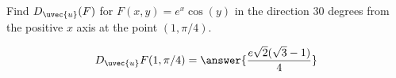 \documentclass{ximera}
\author{David Guichard \and Neal Koblitz \and H. Jerome Keisler \and Albert Scheller \and Barry Balof \and Mike Wills \and Matthew Carr \and Bart Snapp}
\begin{document}
\begin{exercise}

Find $D_{\uvec{u}}( F)$ for $F(x,y)=e^{x}\cos(y)$ in the direction $30$ degrees from the positive $x$ axis at the point $(1,\pi/4)$. 
\begin{prompt}
\[
D_{\uvec{u}}F(1,\pi/4)=\answer{\frac{e\sqrt{2}(\sqrt{3}-1)}{4}}
\]
\end{prompt}

\end{exercise}
\end{document}
